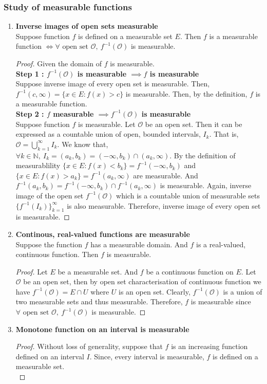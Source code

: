 \subsubsection{Study of measurable functions}
\begin{enumerate}
	\item \textbf{Inverse images of open sets measurable}\\
		Suppose function $f$ is defined on a measurable set $E$.
	Then $f$ is a measurable function $\iff \forall \text{ open set } \mathcal{O},\ f^{-1}(\mathcal{O})$ is measurable.
	\begin{proof}
	Given the domain of $f$ is measurable.\\
	\textbf{Step 1 : $f^{-1}(\mathcal{O})$ is measurable $\implies f$ is measurable}\\
	Suppose inverse image of every open set is measurable.
	Then, $f^{-1}(c,\infty) = \{ x \in E : f(x) > c \}$ is measurable.
	Then, by the definition, $f$ is a measurable function.\\

	\textbf{Step 2 : $f$ measurable $\implies f^{-1}(\mathcal{O})$ is measurable}\\
	Suppose function $f$ is measurable.
	Let $\mathcal{O}$ be an open set.
	Then it can be expressed as a countable union of open, bounded intervals, $I_k$.
	That is, $\displaystyle \mathcal{O} = \bigcup_{k=1}^\infty I_k$.
	We know that, $\forall k \in \mathbb{N},\ I_k = (a_k,b_k) = (-\infty,b_k) \cap (a_k,\infty)$.
	By the definition of measurablility $\{ x \in E : f(x) < b_k \} = f^{-1}(-\infty,b_k)$ and $\{ x\in E : f(x) > a_k \} = f^{-1}(a_k,\infty)$ are measurable.
	And $f^{-1}(a_k,b_k) = f^{-1}(-\infty,b_k) \cap f^{-1}(a_k,\infty)$  is measurable.
	Again, inverse image of the open set $f^{-1}(\mathcal{O})$ which is a countable union of measurable sets $\{f^{-1}(I_k)\}_{k=1}^\infty$ is also measurable.
	Therefore, inverse image of every open set is measurable.
	\end{proof}
\item \textbf{Continous, real-valued functions are measurable}\\
	Suppose the function $f$ has a measurable domain. And $f$ is a real-valued, continuous function. Then $f$ is measurable.
	\begin{proof}
	Let $E$ be a measurable set.
	And $f$ be a continuous function on $E$.
	Let $\mathcal{O}$ be an open set, then by open set characterisation of continuous function we have $f^{-1}(\mathcal{O}) = E \cap U$ where $U$ is an open set.
	Clearly, $f^{-1}(\mathcal{O})$ is a union of two measurable sets and thus measurable.
	Therefore, $f$ is measurable since $\forall \text{ open set } \mathcal{O},\ f^{-1}(\mathcal{O})$ is measurable.
	\end{proof}
\item \textbf{Monotone function on an interval is measurable}
	\begin{proof}
		Without loss of generality, suppose that $f$ is an increasing function defined on an interval $I$.
		Since, every interval is measurable, $f$ is defined on a measurable set.\\


\end{proof}
\end{enumerate}
